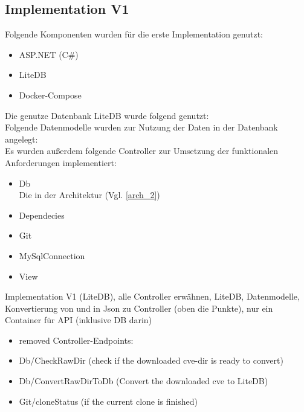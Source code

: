 \subsection{Implementation V1} \label{sec:Implementation1}
    Folgende Komponenten wurden für die erste Implementation genutzt:
    \begin{itemize}
        \item ASP.NET (C\#)
        \item LiteDB
        \item Docker-Compose
    \end{itemize}
    Die genutze Datenbank LiteDB wurde folgend genutzt:\\ %
    Folgende Datenmodelle wurden zur Nutzung der Daten in der Datenbank angelegt:\\ %
    Es wurden außerdem folgende Controller zur Umsetzung der funktionalen Anforderungen implementiert:
    \begin{itemize}
        \item Db \\
            Die in der Architektur (Vgl. \ref{arch_2})
        \item Dependecies
        \item Git
        \item MySqlConnection
        \item View
    \end{itemize}

    Implementation V1 (LiteDB), alle Controller erwähnen, LiteDB, Datenmodelle, Konvertierung von und in Json zu Controller (oben die Punkte), nur ein Container für API (inklusive DB darin)
    \begin{itemize}
        \item removed Controller-Endpoints:
        \item Db/CheckRawDir (check if the downloaded cve-dir is ready to convert)
        \item Db/ConvertRawDirToDb (Convert the downloaded cve to LiteDB)
        \item Git/cloneStatus (if the current clone is finished)
    \end{itemize}